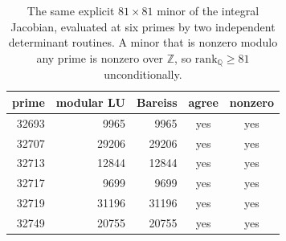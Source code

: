\begin{table}[t]
\centering
\small
\begin{tabular}{rrrcc}
\hline
prime & modular LU & Bareiss & agree & nonzero \\
\hline
32693 & 9965 & 9965 & yes & yes \\
32707 & 29206 & 29206 & yes & yes \\
32713 & 12844 & 12844 & yes & yes \\
32717 & 9699 & 9699 & yes & yes \\
32719 & 31196 & 31196 & yes & yes \\
32749 & 20755 & 20755 & yes & yes \\
\hline
\end{tabular}
\caption{The same explicit $81\times81$ minor of the integral Jacobian, evaluated at six primes by two independent determinant routines. A minor that is nonzero modulo any prime is nonzero over $\mathbb{Z}$, so $\mathrm{rank}_{\mathbb{Q}} \geq 81$ unconditionally.}
\label{tab:minor}
\end{table}

